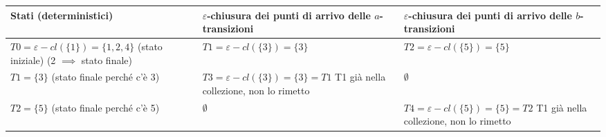 \documentclass{standalone}
\providecommand\lightrule{%
	\arrayrulecolor{black!30}%
	\midrule[\lightrulewidth]%
	\arrayrulecolor{black}}
\begin{document}
\begin{tabularx}{\textwidth}{XXX}
    Stati (deterministici) & \(\varepsilon\)-chiusura dei punti di arrivo delle \(a\)-transizioni & \(\varepsilon\)-chiusura dei punti di arrivo delle \(b\)-transizioni \\
    \midrule
        \(T0 = \varepsilon-cl(\{1\}) = \{1,2,4\}\) \newline
        (stato iniziale) \newline
        (2 \(\implies\) stato finale)
        &
        \(T1 = \varepsilon-cl(\{3\}) = \{3\} \) \newline
        [T1 unmarked]
        &
        \(T2 = \varepsilon-cl(\{5\}) = \{5\}\) \newline 
        [T2 unmarked]
        \\ \lightrule
        \(T1 = \{3\}\) \newline
        (stato finale perché c’è 3)
        &
        \(T3 = \varepsilon-cl(\{3\}) = \{3\} = T1\) \newline
        T1 già nella collezione, non lo rimetto
        &
        \(\emptyset\)
        \\ \lightrule
        \(T2 = \{5\}\) \newline
        (stato finale perché c’è 5)
        &
        \(\emptyset\)
        &
        \(T4 = \varepsilon-cl(\{5\}) = \{5\} = T2\)
        T1 già nella collezione, non lo rimetto
        \\
\end{tabularx}
\end{document}
